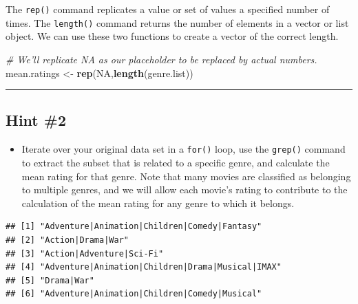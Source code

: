 \documentclass[]{book}
\newenvironment{Shaded}{\begin{snugshade}}{\end{snugshade}}
\newcommand{\KeywordTok}[1]{\textcolor[rgb]{0.13,0.29,0.53}{\textbf{{#1}}}}
\newcommand{\StringTok}[1]{\textcolor[rgb]{0.31,0.60,0.02}{{#1}}}
\newcommand{\CommentTok}[1]{\textcolor[rgb]{0.56,0.35,0.01}{\textit{{#1}}}}
\newcommand{\OtherTok}[1]{\textcolor[rgb]{0.56,0.35,0.01}{{#1}}}
\newcommand{\NormalTok}[1]{{#1}}
\providecommand{\tightlist}{%
  \setlength{\itemsep}{0pt}\setlength{\parskip}{0pt}}
\begin{document}
The \texttt{rep()} command replicates a value or set of values a
specified number of times. The \texttt{length()} command returns the
number of elements in a vector or list object. We can use these two
functions to create a vector of the correct length.

\begin{Shaded}
\begin{Highlighting}[]
\CommentTok{# We'll replicate NA as our placeholder to be replaced by actual numbers.}
\NormalTok{mean.ratings <-}\StringTok{ }\KeywordTok{rep}\NormalTok{(}\OtherTok{NA}\NormalTok{,}\KeywordTok{length}\NormalTok{(genre.list))}
\end{Highlighting}
\end{Shaded}

\begin{center}\rule{0.5\linewidth}{\linethickness}\end{center}

\subsection{Hint \#2}\label{hint-2-1}

\begin{itemize}
\tightlist
\item
  Iterate over your original data set in a \texttt{for()} loop, use the
  \texttt{grep()} command to extract the subset that is related to a
  specific genre, and calculate the mean rating for that genre. Note
  that many movies are classified as belonging to multiple genres, and
  we will allow each movie's rating to contribute to the calculation of
  the mean rating for any genre to which it belongs.
\end{itemize}

\begin{Shaded}
\end{Shaded}

\begin{verbatim}
## [1] "Adventure|Animation|Children|Comedy|Fantasy"    
## [2] "Action|Drama|War"                               
## [3] "Action|Adventure|Sci-Fi"                        
## [4] "Adventure|Animation|Children|Drama|Musical|IMAX"
## [5] "Drama|War"                                      
## [6] "Adventure|Animation|Children|Comedy|Musical"
\end{verbatim}
\end{document}

